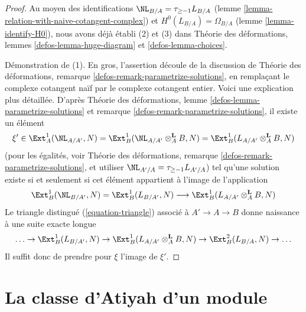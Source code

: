 \begin{proof}
Au moyen des identifications $\NL_{B/A} = \tau_{\geq -1}L_{B/A}$ (lemme
\ref{lemma-relation-with-naive-cotangent-complex}) et
$H^0(L_{B/A}) = \Omega_{B/A}$ (lemme \ref{lemma-identify-H0}), nous avons déjà
établi (2) et (3) dans Théorie des déformations, lemmes
\ref{defos-lemma-huge-diagram} et \ref{defos-lemma-choices}.

\medskip\noindent
Démonstration de (1). En gros, l'assertion découle de la discussion de Théorie
des déformations, remarque \ref{defos-remark-parametrize-solutions}, en
remplaçant le complexe cotangent naïf par le complexe cotangent entier. Voici
une explication plus détaillée. D'après Théorie des déformations, lemme
\ref{defos-lemma-parametrize-solutions} et remarque
\ref{defos-remark-parametrize-solutions}, il existe un élément
$$
\xi' \in
\Ext^1_A(\NL_{A/A'}, N) =
\Ext^1_B(\NL_{A/A'} \otimes_A^\mathbf{L} B, N) =
\Ext^1_B(L_{A/A'} \otimes_A^\mathbf{L} B, N)
$$
(pour les égalités, voir Théorie des déformations, remarque
\ref{defos-remark-parametrize-solutions}, et utiliser
$\NL_{A'/A} = \tau_{\geq -1} L_{A'/A}$) tel qu'une solution existe si et
seulement si cet élément appartient à l'image de l'application
$$
\Ext^1_B(\NL_{B/A'}, N) = \Ext^1_B(L_{B/A'}, N)
\longrightarrow
\Ext^1_B(L_{A/A'} \otimes_A^\mathbf{L} B, N)
$$
Le triangle distingué (\ref{equation-triangle}) associé à
$A' \to A \to B$ donne naissance à une suite exacte longue
$$
\ldots \to
\Ext^1_B(L_{B/A'}, N) \to
\Ext^1_B(L_{A/A'} \otimes_A^\mathbf{L} B, N) \to
\Ext^2_B(L_{B/A}, N) \to \ldots
$$
Il suffit donc de prendre pour $\xi$ l'image de $\xi'$.
\end{proof}





\section{La classe d'Atiyah d'un module}
\label{section-atiyah}

